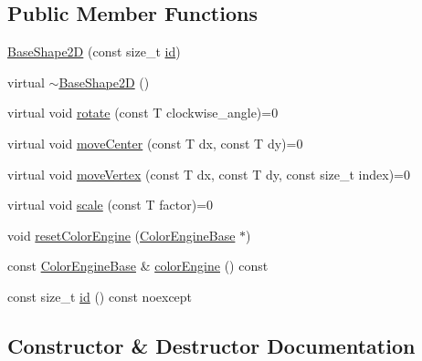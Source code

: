 \subsection*{Public Member Functions}
\begin{DoxyCompactItemize}
\item 
\hyperlink{classGraphicalEditorCore_1_1BaseShape2D_a5d316bdae47e5b53ea6737f918a1340a}{Base\+Shape2D} (const size\+\_\+t \hyperlink{classGraphicalEditorCore_1_1BaseShape2D_ac66cfa23289ae36d70ff6b7c41dd791f}{id})
\item 
virtual \hyperlink{classGraphicalEditorCore_1_1BaseShape2D_ac3cf9262d27b9b1b84afc8ddb729f743}{$\sim$\+Base\+Shape2D} ()
\item 
virtual void \hyperlink{classGraphicalEditorCore_1_1BaseShape2D_a94a87b2fd8485cfb7d4ca97050d1bdde}{rotate} (const T clockwise\+\_\+angle)=0
\item 
virtual void \hyperlink{classGraphicalEditorCore_1_1BaseShape2D_adebef5c637da2c34a2fe728022740f94}{move\+Center} (const T dx, const T dy)=0
\item 
virtual void \hyperlink{classGraphicalEditorCore_1_1BaseShape2D_a9e6394ecf62e475a1d087e89258d4131}{move\+Vertex} (const T dx, const T dy, const size\+\_\+t index)=0
\item 
virtual void \hyperlink{classGraphicalEditorCore_1_1BaseShape2D_a2ff960ec57b180222a084642fa7dc780}{scale} (const T factor)=0
\item 
void \hyperlink{classGraphicalEditorCore_1_1BaseShape2D_abd6e21c5c3911a2926b210dd69584571}{reset\+Color\+Engine} (\hyperlink{classGraphicalEditorCore_1_1ColorEngineBase}{Color\+Engine\+Base} $\ast$)
\item 
const \hyperlink{classGraphicalEditorCore_1_1ColorEngineBase}{Color\+Engine\+Base} \& \hyperlink{classGraphicalEditorCore_1_1BaseShape2D_aed3e9da5f221282c0b7f958ad7c834c5}{color\+Engine} () const 
\item 
const size\+\_\+t \hyperlink{classGraphicalEditorCore_1_1BaseShape2D_ac66cfa23289ae36d70ff6b7c41dd791f}{id} () const noexcept
\end{DoxyCompactItemize}


\subsection{Constructor \& Destructor Documentation}
